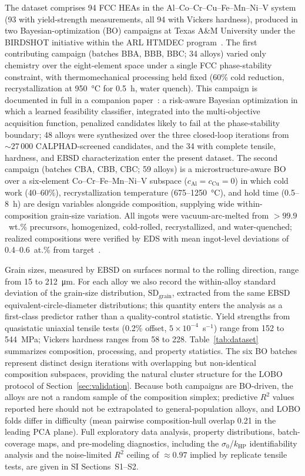 \documentclass[5p,times,twocolumn]{elsarticle}
\begin{document}
The dataset comprises 94 FCC HEAs in the Al--Co--Cr--Cu--Fe--Mn--Ni--V system (93 with yield-strength measurements, all 94 with Vickers hardness), produced in two Bayesian-optimization (BO) campaigns at Texas A\&M University under the BIRDSHOT initiative within the ARL HTMDEC program~\cite{Mulukutla2026BRAVE}. The first contributing campaign (batches BBA, BBB, BBC; 34 alloys) varied only chemistry over the eight-element space under a single FCC phase-stability constraint, with thermomechanical processing held fixed (60\% cold reduction, recrystallization at 950~\si{\degreeCelsius} for 0.5~h, water quench). This campaign is documented in full in a companion paper~\cite{Mulukutla2026BRAVE}: a risk-aware Bayesian optimization in which a learned feasibility classifier, integrated into the multi-objective acquisition function, penalized candidates likely to fail at the phase-stability boundary; 48 alloys were synthesized over the three closed-loop iterations from ${\sim}27\,000$ CALPHAD-screened candidates, and the 34 with complete tensile, hardness, and EBSD characterization enter the present dataset. The second campaign (batches CBA, CBB, CBC; 59 alloys) is a microstructure-aware BO over a six-element Co--Cr--Fe--Mn--Ni--V subspace ($c_\text{Al} = c_\text{Cu} = 0$) in which cold work (40--60\%), recrystallization temperature (675--1250~\si{\degreeCelsius}), and hold time (0.5--8~h) are design variables alongside composition, supplying wide within-composition grain-size variation. All ingots were vacuum-arc-melted from $>99.9$~wt.\% precursors, homogenized, cold-rolled, recrystallized, and water-quenched; realized compositions were verified by EDS with mean ingot-level deviations of 0.4--0.6~at.\% from target~\cite{Mulukutla2024BIRDSHOT}.

Grain sizes, measured by EBSD on surfaces normal to the rolling direction, range from 15 to 212~\si{\micro\meter}. For each alloy we also record the within-alloy standard deviation of the grain-size distribution, $\text{SD}_\text{grain}$, extracted from the same EBSD equivalent-circle-diameter distributions; this quantity enters the analysis as a first-class predictor rather than a quality-control statistic. Yield strengths from quasistatic uniaxial tensile tests (0.2\% offset, $5\times10^{-4}$~s$^{-1}$) range from 152 to 544~\si{MPa}; Vickers hardness ranges from 58 to 228. Table~\ref{tab:dataset} summarizes composition, processing, and property statistics. The six BO batches represent distinct design iterations with overlapping but non-identical composition subspaces, providing the natural cluster structure for the LOBO protocol of Section~\ref{sec:validation}. Because both campaigns are BO-driven, the alloys are not a random sample of the composition simplex; predictive $R^2$ values reported here should not be extrapolated to general-population alloys, and LOBO folds differ in difficulty (mean pairwise composition-hull overlap 0.21 in the leading PCA plane). Full exploratory data analysis, property distributions, batch-coverage maps, and pre-modeling diagnostics, including the $\sigma_0$/$k_\text{HP}$ identifiability analysis and the noise-limited $R^2$ ceiling of ${\approx}0.97$ implied by replicate tensile tests, are given in SI Sections~S1--S2.
\end{document}
